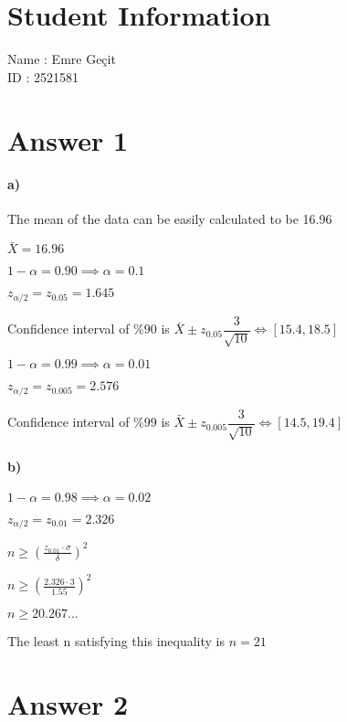 \documentclass[12pt]{article}
\begin{document}
\section*{Student Information}

Name : Emre Geçit\\

ID : 2521581\\



\section*{Answer 1}
\paragraph{a)}
The mean of the data can be easily calculated to be 16.96

$\bar{X} = 16.96$

$1-\alpha = 0.90 \implies \alpha = 0.1$

$z_{\alpha/2} = z_{0.05} = 1.645$

Confidence interval of $\%90$ is $\bar{X} \pm z_{0.05}\dfrac{3}{\sqrt{10}} \Leftrightarrow [15.4, 18.5]$

$1-\alpha = 0.99 \implies \alpha = 0.01$

$z_{\alpha/2} = z_{0.005} = 2.576$

Confidence interval of $\%99$ is $\bar{X} \pm z_{0.005}\dfrac{3}{\sqrt{10}} \Leftrightarrow [14.5, 19.4]$
\paragraph{b)}
$1-\alpha = 0.98 \implies \alpha = 0.02$

$z_{\alpha/2} = z_{0.01} = 2.326$
\begin{center}
$n \geq (\frac{z_{0.01}\cdot\sigma}{\delta})^2$
\end{center}
\begin{center}
    $n \geq (\frac{2.326\cdot3}{1.55})^2$
\end{center}
\begin{center}
    $n \geq 20.267...$
\end{center}

The least n satisfying this inequality is $n = 21$

\newpage
\section*{Answer 2}
\end{document}
